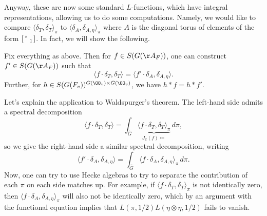 \documentclass[../notes.tex]{subfiles}
\begin{document}
Anyway, these are now some standard $L$-functions, which have integral representations, allowing us to do some computations. Namely, we would like to compare $\langle\delta_T,\delta_T\rangle_\pi$ to $\langle\delta_A,\delta_{A,\eta}\rangle_\pi$ where $A$ is the diagonal torus of elements of the form $\begin{bsmallmatrix}
	* \\ & 1
\end{bsmallmatrix}$. In fact, we will show the following.
\begin{theorem}[Jacquet]
	Fix everything as above. Then for $f\in S(G(\AA_F))$, one can construct $f'\in S(G(\AA_F))$ such that
	\[\langle f\cdot\delta_T,\delta_T\rangle=\langle f'\cdot\delta_A,\delta_{A,\eta}\rangle.\]
	Further, for $h\in S(G(F_v))^{G(\OO_v)\times G(\OO_v)}$, we have $h*f=h*f'$.
\end{theorem}
Let's explain the application to Waldspurger's theorem. The left-hand side admits a spectral decomposition
\[\langle f\cdot\delta_T,\delta_T\rangle=\int_{\widehat G}\underbrace{\langle f\cdot\delta_T,\delta_T\rangle_\pi}_{J_\pi(f)\coloneqq}\,d\pi,\]
so we give the right-hand side a similar spectral decomposition, writing
\[\langle f'\cdot\delta_A,\delta_{A,\eta}\rangle=\int_{\widehat G}\langle f\cdot\delta_A,\delta_{A,\eta}\rangle_\pi\,d\pi.\]
Now, one can try to use Hecke algebras to try to separate the contribution of each $\pi$ on each side matches up. For example, if $\langle f\cdot\delta_T,\delta_T\rangle_\pi$ is not identically zero, then $\langle f\cdot\delta_A,\delta_{A,\eta}\rangle_\pi$ will also not be identically zero, which by an argument with the functional equation implies that $L(\pi,1/2)L(\eta\otimes\eta,1/2)$ fails to vanish.
\end{document}
